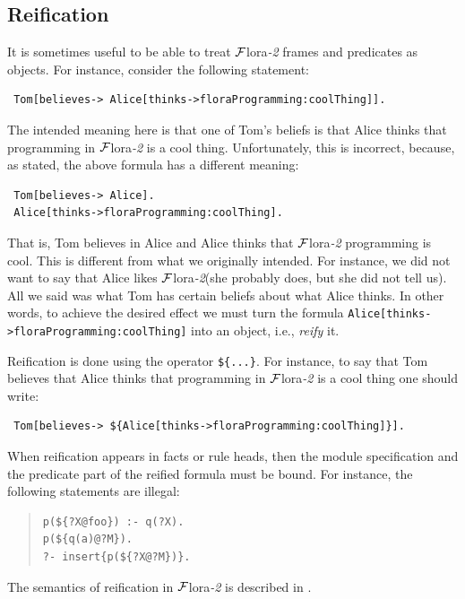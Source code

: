 \documentclass[11pt]{article}
\newcommand{\FLSYSTEM}{{\mbox{\sc ${\cal F}${lora}\rm\emph{-2}}}\xspace}
\begin{document}
\subsection{Reification}
\label{sec-reification}

It is sometimes useful to be able to treat \FLSYSTEM frames and predicates
as objects. For instance, consider the following statement:
\begin{verbatim}
 Tom[believes-> Alice[thinks->floraProgramming:coolThing]].
\end{verbatim}
The intended meaning here is that one of Tom's beliefs is that Alice
thinks that programming in \FLSYSTEM is a cool thing. Unfortunately, this is
incorrect, because, as stated, the above formula has a different meaning:
\begin{verbatim}
 Tom[believes-> Alice].
 Alice[thinks->floraProgramming:coolThing].  
\end{verbatim}
That is, Tom believes in Alice and Alice thinks that \FLSYSTEM programming is
cool. This is different from what we originally intended. For instance, we
did not want to say that Alice likes \FLSYSTEM (she probably does, but she did
not tell us). All we said was what Tom has certain beliefs about what Alice
thinks. In other words, to achieve the desired effect we must turn the
formula {\tt Alice[thinks->floraProgramming:coolThing]} into an object,
i.e., \emph{reify} it.

Reification is done using the operator {\tt \$\{...\}}. For instance, to
say that Tom believes that Alice thinks that programming in \FLSYSTEM is a
cool thing one should write:
\begin{verbatim}
 Tom[believes-> ${Alice[thinks->floraProgramming:coolThing]}].
\end{verbatim}

When reification appears in facts or rule heads, then the module
specification and the predicate part of the reified formula must be bound.
For instance, the following statements are illegal:
\begin{quote}
\begin{verbatim}
p(${?X@foo}) :- q(?X).
p(${q(a)@?M}).
?- insert{p(${?X@?M})}. 
\end{verbatim}
\end{quote}

\noindent
The semantics of reification in \FLSYSTEM is described in
\cite{reification-data-semantics-03}.
\end{document}
